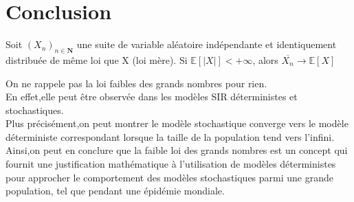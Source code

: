 \chapter{Conclusion}

\begin{theorem}
 Soit $(X_n)_{n \in \boldsymbol{N}}$ une suite de variable aléatoire indépendante et identiquement distribuée de même loi que X (loi mère). Si $\mathbb{E}[|X|] < +\infty$, alors $\overline{X_n} \rightarrow \mathbb{E}[X]$
\end{theorem}


On ne rappele pas la loi faibles des grands nombres pour rien.\\
En effet,elle peut être observée dans les modèles SIR déterministes et stochastiques.\\
Plus précisément,on peut montrer le modèle stochastique converge vers le modèle déterministe correspondant lorsque la taille de la population tend vers l'infini. Ainsi,on peut en conclure que la faible loi des grands nombres est un concept qui fournit une justification mathématique à l'utilisation de modèles déterministes pour approcher le comportement des modèles stochastiques parmi une grande population, tel que pendant une épidémie mondiale.

